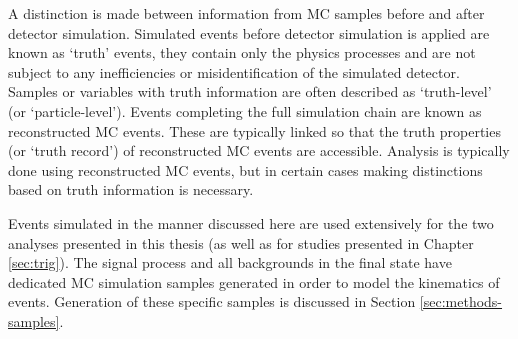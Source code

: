 A distinction is made between information from \ac{MC} samples before and after
detector simulation. Simulated events before detector simulation is applied are
known as `truth' events, they contain only the physics processes and are not
subject to any inefficiencies or misidentification of the simulated detector.
Samples or variables with truth information are often described as `truth-level'
(or `particle-level').
Events completing the full simulation chain are known as reconstructed \ac{MC}
events. These are typically linked so that the truth properties (or `truth
record') of reconstructed \ac{MC} events are accessible. Analysis is typically
done using reconstructed \ac{MC} events, but in certain cases making
distinctions based on truth information is necessary.

Events simulated in the manner discussed here are used extensively for the two
analyses presented in this thesis (as well as for studies presented in Chapter
\ref{sec:trig}). The signal process and all backgrounds in the final state have
dedicated \ac{MC} simulation samples generated in order to model the kinematics
of events. Generation of these specific samples is discussed in Section
\ref{sec:methods-samples}.
